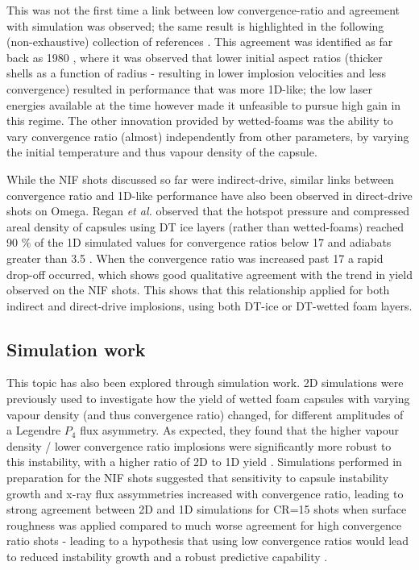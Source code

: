 This was not the first time a link between low convergence-ratio and agreement with simulation was observed; the same result is highlighted in the following (non-exhaustive) collection of references \cite{Kato1996, Nishimura2000, Meyerhofer2001, Li2002, Lindl2004, LePape2014, Khan2016, Haines2017a}. This agreement was identified as far back as 1980 \cite{Key1980}, where it was observed that lower initial aspect ratios (thicker shells as a function of radius - resulting in lower implosion velocities and less convergence) resulted in performance that was more 1D-like; the low laser energies available at the time however made it unfeasible to pursue high gain in this regime. The other innovation provided by wetted-foams was the ability to vary convergence ratio (almost) independently from other parameters, by varying the initial temperature and thus vapour density of the capsule.

While the NIF shots discussed so far were indirect-drive, similar links between convergence ratio and 1D-like performance have also been observed in direct-drive shots on Omega. Regan \textit{et al.} observed that the hotspot pressure and compressed areal density of capsules using DT ice layers (rather than wetted-foams) reached 90 \% of the 1D simulated values for convergence ratios below 17 and adiabats greater than 3.5 \cite{Regan2016}. When the convergence ratio was increased past 17 a rapid drop-off occurred, which shows good qualitative agreement with the trend in yield observed on the NIF shots. This shows that this relationship applied for both indirect and direct-drive implosions, using both DT-ice or DT-wetted foam layers.


\subsection{Simulation work} 

This topic has also been explored through simulation work. 2D simulations were previously used to investigate how the yield of wetted foam capsules with varying vapour density (and thus convergence ratio) changed, for different amplitudes of a Legendre $P_4$ flux asymmetry. As expected, they found that the higher vapour density / lower convergence ratio implosions were significantly more robust to this instability, with a higher ratio of 2D to 1D yield \cite{Olson2013}. Simulations performed in preparation for the NIF shots suggested that sensitivity to capsule instability growth and x-ray flux assymmetries increased with convergence ratio, leading to strong agreement between 2D and 1D simulations for CR=15 shots when surface roughness was applied compared to much worse agreement for high convergence ratio shots - leading to a hypothesis that using low convergence ratios would lead to reduced instability growth and a robust predictive capability \cite{Olson2016a}. 

